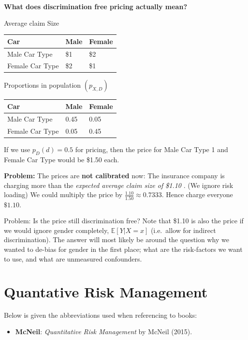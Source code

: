 \documentclass[a4paper,12pt,openany]{book}
\providecommand{\tightlist}{%
 \setlength{\itemsep}{0pt}\setlength{\parskip}{0pt}}
\begin{document}
\textbf{What does discrimination free pricing actually mean?}

Average claim Size

\begin{longtable}[]{@{}lll@{}}
\toprule()
Car & Male & Female \\
\midrule()
\endhead
Male Car Type & \$1 & \$2 \\
Female Car Type & \$2 & \$1 \\
\bottomrule()
\end{longtable}

Proportions in population \((p_{X,D})\)

\begin{longtable}[]{@{}lll@{}}
\toprule()
Car & Male & Female \\
\midrule()
\endhead
Male Car Type & 0.45 & 0.05 \\
Female Car Type & 0.05 & 0.45 \\
\bottomrule()
\end{longtable}

If we use \(p_D(d) = 0.5\) for pricing, then the price for Male Car Type 1 and Female Car Type would be \$1.50 each.

\textbf{Problem:} The prices are \textbf{not calibrated} now: The insurance company is charging more than the \emph{expected average claim size of \$1.10 }. (We ignore risk loading) We could multiply the price by \(\frac{1.10}{1.50}\approx 0.7333\). Hence charge everyone \(\$1.10\).

Problem: Is the price still discrimination free? Note that \$1.10 is also the price if we would ignore gender completely, \(\mathbb E[Y|X=x]\) (i.e.~allow for indirect discrimination). The answer will most likely be around the question why we wanted to de-bias for gender in the first place; what are the risk-factors we want to use, and what are unmeasured confounders.

\hypertarget{quantative-risk-management}{%
\chapter{Quantative Risk Management}\label{quantative-risk-management}}

Below is given the abbreviations used when referencing to books:

\begin{itemize}
\tightlist
\item
  \textbf{McNeil}: \emph{Quantitative Risk Management} by McNeil (2015).\cite{mcneil2015}
\end{itemize}
\end{document}
